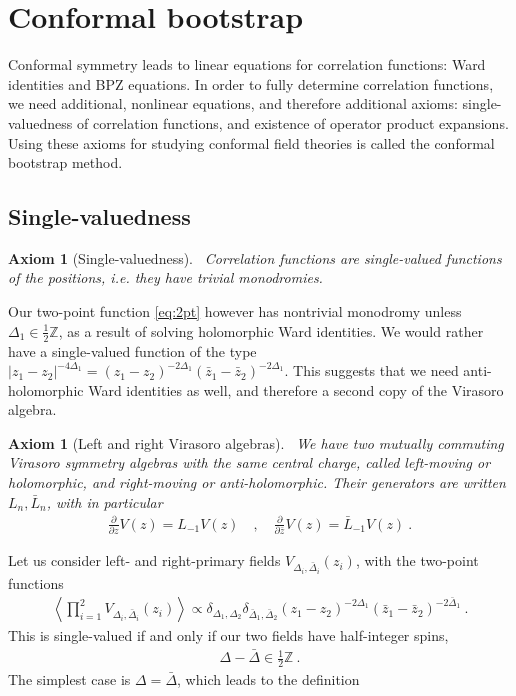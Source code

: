 \documentclass[12pt, a4paper]{article}
\theoremstyle{break}
\newtheorem{hyp}[exo]{Axiom}
\begin{document}
\section{Conformal bootstrap}

Conformal symmetry leads to linear equations for correlation functions: Ward identities and BPZ equations. 
In order to fully determine correlation functions, we need additional, nonlinear equations, and therefore additional axioms: single-valuedness of correlation functions, and existence of operator product expansions. 
Using these axioms for studying conformal field theories is called the conformal bootstrap method. 

\subsection{Single-valuedness}

\begin{hyp}[Single-valuedness]
 ~\label{hyp:sv}
 Correlation functions are single-valued functions of the positions, i.e. they have trivial monodromies.
\end{hyp}

Our two-point function \eqref{eq:2pt} however has nontrivial monodromy unless $\Delta_1\in \frac12\mathbb{Z}$, as a  result of solving holomorphic Ward identities. 
We would rather have a single-valued function of the type $|z_1-z_2|^{-4\Delta_1} = (z_1-z_2)^{-2\Delta_1} (\bar z_1-\bar z_2)^{-2\Delta_1}$.
This suggests that we need anti-holomorphic Ward identities as well, and therefore a second copy of the Virasoro algebra.

\begin{hyp}[Left and right Virasoro algebras]
 ~\label{hyp:lr}
 We have two mutually commuting Virasoro symmetry algebras with the same central charge, called left-moving or holomorphic, and right-moving or anti-holomorphic. Their generators are written $L_n,\bar L_n$, with in particular
 \begin{align}
  \frac{\partial}{\partial z} V(z) = L_{-1}V(z)   \quad , \quad \frac{\partial}{\partial \bar z} V(z)= \bar L_{-1} V(z)   \ .
 \end{align}
\end{hyp}

Let us consider left- and right-primary fields $V_{\Delta_i,\bar\Delta_i}(z_i)$, with the 
two-point functions
\begin{align}
 \left<\prod_{i=1}^2 V_{\Delta_i,\bar\Delta_i}(z_i) \right> \propto \delta_{\Delta_1,\Delta_2}\delta_{\bar\Delta_1,\bar\Delta_2} (z_1-z_2)^{-2\Delta_1} (\bar z_1-\bar z_2)^{-2\bar\Delta_1}\ .
\end{align}
This is single-valued if and only if our two fields have half-integer spins,
\begin{align}
 \Delta -\bar \Delta \in \frac12\mathbb{Z}\ .
\end{align} 
The simplest case is $\Delta=\bar\Delta$, which leads to the definition
\end{document}
